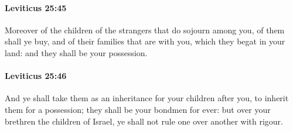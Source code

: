 		\paragraph{Leviticus 25:45} %
			\label{LEVITICUS-25-45}

			Moreover of the children of the strangers that do sojourn among you, of them shall ye buy, and of their families that are with you, which they begat in your land: and they shall be your possession.


		\paragraph{Leviticus 25:46} %
			\label{LEVITICUS-25-46}

			And ye shall take them as an inheritance for your children after you, to inherit them for a possession; they shall be your bondmen for ever: but over your brethren the children of Israel, ye shall not rule one over another with rigour.

